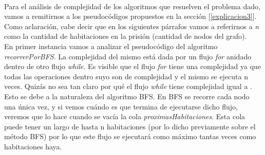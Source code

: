 \paragraph{}
Para el análisis de complejidad de los algoritmos que resuelven el problema dado, vamos a remitirnos a los pseudocódigos propuestos en la sección [\ref{explicacion3}]. Como aclaración, cabe decir que en los siguientes párrafos vamos a referirnos a \textit{n} como la cantidad de habitaciones en la prisión (cantidad de nodos del grafo).\\
En primer instancia vamos a analizar el pseudocódigo del algoritmo \textit{recorrerPorBFS}. La complejidad del mismo está dada por un flujo \textit{for} anidado dentro de otro flujo \textit{while}. Es visible que el flujo \textit{for} tiene una complejidad  ya que todas las operaciones dentro suyo son de complejidad  y el mismo se ejecuta n veces. Quizás no sea tan claro por qué el flujo \textit{while} tiene complejidad igual a . Esto se debe a la naturaleza del algoritmo BFS. En BFS se recorre cada nodo una única vez, y si vemos cuándo es que termina de ejecutarse dicho flujo, veremos que lo hace cuando se vacía la cola \textit{proximasHabitaciones}. Esta cola puede tener un largo de hasta n habitaciones (por lo dicho previamente sobre el método BFS) por lo que este flujo se ejecutará como máximo tantas veces como habitaciones haya.

